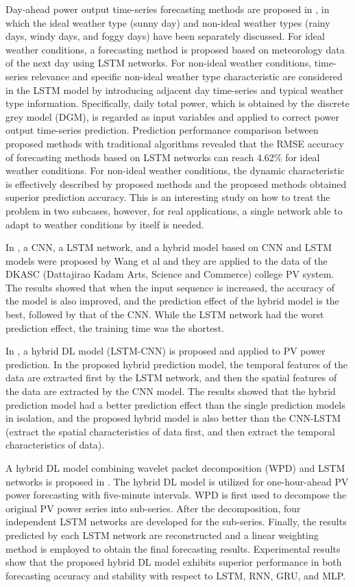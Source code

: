 Day-ahead power output time-series forecasting methods are proposed in \cite{GAO2019115838}, in which the ideal weather type (sunny day) and non-ideal weather types (rainy days, windy days, and foggy days) have been separately discussed.
For ideal weather conditions, a forecasting method is proposed based on meteorology data of the next day using LSTM networks.
For non-ideal weather conditions, time-series relevance and specific non-ideal weather type characteristic are considered in the LSTM model by introducing adjacent day time-series and typical weather type information.
Specifically, daily total power, which is obtained by the discrete grey model (DGM), is regarded as input variables and applied to correct power output time-series prediction.
Prediction performance comparison between proposed methods with traditional algorithms revealed that the RMSE accuracy of forecasting methods based on LSTM networks can reach 4.62\% for ideal weather conditions.
For non-ideal weather conditions, the dynamic characteristic is effectively described by proposed methods and the proposed methods obtained superior prediction accuracy.
This is an interesting study on how to treat the problem in two subcases, however,  for real applications, a single network able to adapt to weather conditions by itself is needed.

In \cite{WANG2019113315}, a CNN, a LSTM network, and a hybrid model based on CNN and LSTM models were proposed by Wang et al and they are applied to the data of the DKASC (Dattajirao Kadam Arts, Science and Commerce) college PV system.
The results showed that when the input sequence is increased, the accuracy of the model is also improved, and the prediction effect of the hybrid model is the best, followed by that of the CNN.
While the LSTM network had the worst prediction effect, the training time was the shortest.

In \cite{WANG2019116225}, a hybrid DL model (LSTM-CNN) is proposed and applied to PV power prediction.
In the proposed hybrid prediction model, the temporal features of the data are extracted first by the LSTM network, and then the spatial features of the data are extracted by the CNN model.
The results showed that the hybrid prediction model had a better prediction effect than the single prediction models in isolation, and the proposed hybrid model is also better than the CNN-LSTM (extract the spatial characteristics of data first, and then extract the temporal characteristics of data).

A hybrid DL model combining wavelet packet decomposition (WPD) and LSTM networks is proposed in \cite{LI2020114216}.
The hybrid DL model is utilized for one-hour-ahead PV power forecasting with five-minute intervals.
WPD is first used to decompose the original PV power series into sub-series.
After the decomposition, four independent LSTM networks are developed for the sub-series.
Finally, the results predicted by each LSTM network are reconstructed and a linear weighting method is employed to obtain the final forecasting results.
Experimental results show that the proposed hybrid DL model exhibits superior performance in both forecasting accuracy and stability with respect to LSTM, RNN, GRU, and MLP.

